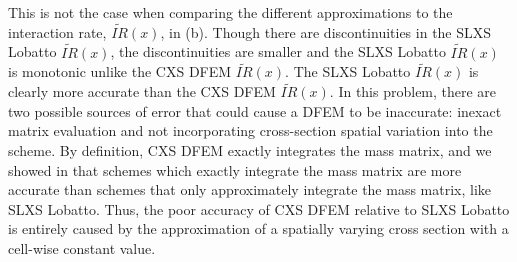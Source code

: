 This is not the case when comparing the different approximations to the interaction rate, $\widetilde{IR}(x)$, in (b).  
Though there are discontinuities in the SLXS Lobatto $\widetilde{IR}(x)$, the discontinuities are smaller and the SLXS Lobatto $\widetilde{IR}(x)$ is monotonic unlike the CXS DFEM $\widetilde{IR}(x)$.   
The SLXS Lobatto $\widetilde{IR}(x)$ is clearly more accurate than the CXS DFEM $\widetilde{IR}(x)$.
%
%
In this problem, there are two possible sources of error that could cause a DFEM to be inaccurate: inexact matrix evaluation and not incorporating cross-section spatial variation into the scheme.
By definition, CXS DFEM exactly integrates the mass matrix, and we showed in \cite{part_1_paper} that schemes which exactly integrate the mass matrix are more accurate than schemes that only approximately integrate the mass matrix, like SLXS Lobatto.
Thus, the poor accuracy of CXS DFEM relative to SLXS Lobatto is entirely caused by the approximation of a spatially varying cross section with a cell-wise constant value.


